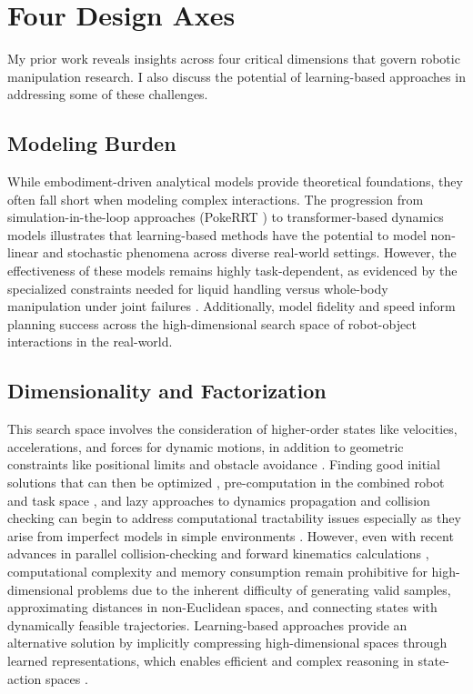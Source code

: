 \section{Four Design Axes}
\label{sec:framework:axes}

My prior work reveals insights across four critical dimensions that govern robotic manipulation research. I also discuss the potential of learning-based approaches in addressing some of these challenges.

\subsection{Modeling Burden}
\label{sec:framework:modeling}

While embodiment-driven analytical models provide theoretical foundations, they often fall short when modeling complex interactions. The progression from simulation-in-the-loop approaches (PokeRRT \cite{pasricha2022pokerrt}) to transformer-based dynamics models \cite{reed2024transformer} illustrates that learning-based methods have the potential to model non-linear and stochastic phenomena across diverse real-world settings. However, the effectiveness of these models remains highly task-dependent, as evidenced by the specialized constraints needed for liquid handling \cite{abderezaei2024clutter} versus whole-body manipulation under joint failures \cite{briscoe2024exploring}. Additionally, model fidelity and speed inform planning success across the high-dimensional search space of robot-object interactions in the real-world.

\subsection{Dimensionality and Factorization}
\label{sec:framework:dimensionality}

This search space involves the consideration of higher-order states like velocities, accelerations, and forces for dynamic motions, in addition to geometric constraints like positional limits and obstacle avoidance \cite{schmerling2019kinodynamic}. Finding good initial solutions that can then be optimized \cite{kuntz2019fast}, pre-computation in the combined robot and task space \cite{shome2021asymptotically,briscoe2024exploring}, and lazy approaches to dynamics propagation and collision checking \cite{pasricha2024virtues} can begin to address computational tractability issues especially as they arise from imperfect models in simple environments \cite{pasricha2022pokerrt,briscoe2024exploring,abderezaei2024clutter}.
However, even with recent advances in parallel collision-checking and forward kinematics calculations \cite{sundaralingam2023curobo,thomason2024motions}, computational complexity and memory consumption remain prohibitive for high-dimensional problems due to the inherent difficulty of generating valid samples, approximating distances in non-Euclidean spaces, and connecting states with dynamically feasible trajectories.
Learning-based approaches provide an alternative solution by implicitly compressing high-dimensional spaces through learned representations, which enables efficient and complex reasoning in state-action spaces \cite{qureshi2020motion}.

